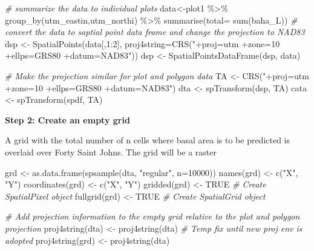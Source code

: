 \documentclass[
]{book}
\newenvironment{Shaded}{\begin{snugshade}}{\end{snugshade}}
\newcommand{\AttributeTok}[1]{\textcolor[rgb]{0.77,0.63,0.00}{#1}}
\newcommand{\CommentTok}[1]{\textcolor[rgb]{0.56,0.35,0.01}{\textit{#1}}}
\newcommand{\ConstantTok}[1]{\textcolor[rgb]{0.00,0.00,0.00}{#1}}
\newcommand{\DecValTok}[1]{\textcolor[rgb]{0.00,0.00,0.81}{#1}}
\newcommand{\FunctionTok}[1]{\textcolor[rgb]{0.00,0.00,0.00}{#1}}
\newcommand{\NormalTok}[1]{#1}
\newcommand{\OtherTok}[1]{\textcolor[rgb]{0.56,0.35,0.01}{#1}}
\newcommand{\SpecialCharTok}[1]{\textcolor[rgb]{0.00,0.00,0.00}{#1}}
\newcommand{\StringTok}[1]{\textcolor[rgb]{0.31,0.60,0.02}{#1}}
\begin{document}
\begin{Shaded}
\begin{Highlighting}[]
\CommentTok{\# summarize the data to individual plots}
\NormalTok{data}\OtherTok{\textless{}{-}}\NormalTok{plot1 }\SpecialCharTok{\%\textgreater{}\%} 
  \FunctionTok{group\_by}\NormalTok{(utm\_eastin,utm\_northi) }\SpecialCharTok{\%\textgreater{}\%}
  \FunctionTok{summarise}\NormalTok{(}\AttributeTok{total=} \FunctionTok{sum}\NormalTok{(baha\_L))}
\CommentTok{\# convert the data to saptial point data frame and change the projection to NAD83}
\NormalTok{dsp }\OtherTok{\textless{}{-}} \FunctionTok{SpatialPoints}\NormalTok{(data[,}\DecValTok{1}\SpecialCharTok{:}\DecValTok{2}\NormalTok{], }\AttributeTok{proj4string=}\FunctionTok{CRS}\NormalTok{(}\StringTok{"+proj=utm +zone=10 +ellps=GRS80 +datum=NAD83"}\NormalTok{))}
\NormalTok{dsp }\OtherTok{\textless{}{-}} \FunctionTok{SpatialPointsDataFrame}\NormalTok{(dsp, data)}

\CommentTok{\# Make the projection similar for plot and polygon data}
\NormalTok{TA }\OtherTok{\textless{}{-}} \FunctionTok{CRS}\NormalTok{(}\StringTok{"+proj=utm +zone=10 +ellps=GRS80 +datum=NAD83"}\NormalTok{)}
\NormalTok{dta }\OtherTok{\textless{}{-}} \FunctionTok{spTransform}\NormalTok{(dsp, TA)}
\NormalTok{cata }\OtherTok{\textless{}{-}} \FunctionTok{spTransform}\NormalTok{(spdf, TA)}
\end{Highlighting}
\end{Shaded}

\textbf{Step 2: Create an empty grid}

A grid with the total number of n cells where basal area is to be predicted is overlaid over Forty Saint Johns. The grid will be a raster

\begin{Shaded}
\begin{Highlighting}[]
\NormalTok{grd              }\OtherTok{\textless{}{-}} \FunctionTok{as.data.frame}\NormalTok{(}\FunctionTok{spsample}\NormalTok{(dta, }\StringTok{"regular"}\NormalTok{, }\AttributeTok{n=}\DecValTok{10000}\NormalTok{))}
\FunctionTok{names}\NormalTok{(grd)       }\OtherTok{\textless{}{-}} \FunctionTok{c}\NormalTok{(}\StringTok{"X"}\NormalTok{, }\StringTok{"Y"}\NormalTok{)}
\FunctionTok{coordinates}\NormalTok{(grd) }\OtherTok{\textless{}{-}} \FunctionTok{c}\NormalTok{(}\StringTok{"X"}\NormalTok{, }\StringTok{"Y"}\NormalTok{)}
\FunctionTok{gridded}\NormalTok{(grd)     }\OtherTok{\textless{}{-}} \ConstantTok{TRUE}  \CommentTok{\# Create SpatialPixel object}
\FunctionTok{fullgrid}\NormalTok{(grd)    }\OtherTok{\textless{}{-}} \ConstantTok{TRUE}  \CommentTok{\# Create SpatialGrid object}

\CommentTok{\# Add projection information to the empty grid relative to the plot and polygon projection }
\FunctionTok{proj4string}\NormalTok{(dta) }\OtherTok{\textless{}{-}} \FunctionTok{proj4string}\NormalTok{(dta) }\CommentTok{\# Temp fix until new proj env is adopted}
\FunctionTok{proj4string}\NormalTok{(grd) }\OtherTok{\textless{}{-}} \FunctionTok{proj4string}\NormalTok{(dta)}
\end{Highlighting}
\end{Shaded}
\end{document}

